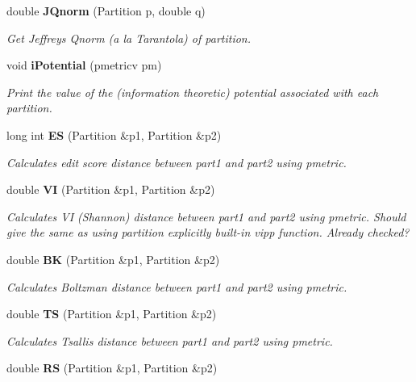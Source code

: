 \begin{CompactItemize}
\item 
double {\bf JQnorm} (Partition p, double q)\label{classPartitionStats_a30}

\begin{CompactList}\small\item\em Get Jeffreys Qnorm (a la Tarantola) of partition. \item\end{CompactList}\item 
void {\bf i\-Potential} (pmetricv pm)\label{classPartitionStats_a31}

\begin{CompactList}\small\item\em Print the value of the (information theoretic) potential associated with each partition. \item\end{CompactList}\item 
long int {\bf ES} (Partition \&p1, Partition \&p2)\label{classPartitionStats_a32}

\begin{CompactList}\small\item\em Calculates edit score distance between part1 and part2 using pmetric. \item\end{CompactList}\item 
double {\bf VI} (Partition \&p1, Partition \&p2)\label{classPartitionStats_a33}

\begin{CompactList}\small\item\em Calculates VI (Shannon) distance between part1 and part2 using pmetric. Should give the same as using partition explicitly built-in vipp function. Already checked? \item\end{CompactList}\item 
double {\bf BK} (Partition \&p1, Partition \&p2)\label{classPartitionStats_a34}

\begin{CompactList}\small\item\em Calculates Boltzman distance between part1 and part2 using pmetric. \item\end{CompactList}\item 
double {\bf TS} (Partition \&p1, Partition \&p2)\label{classPartitionStats_a35}

\begin{CompactList}\small\item\em Calculates Tsallis distance between part1 and part2 using pmetric. \item\end{CompactList}\item 
double {\bf RS} (Partition \&p1, Partition \&p2)\label{classPartitionStats_a36}


\end{CompactItemize}
